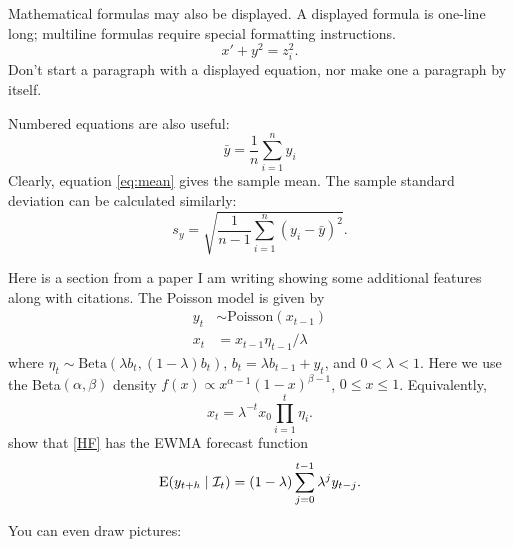 \documentclass[a4paper,11pt]{article}
\newcommand{\info}{{\cal I}}
\newcommand{\E}{\text{E}}
\begin{document}
Mathematical formulas may also be displayed.  A displayed formula
is one-line long; multiline formulas require special formatting
instructions.
\[
  x' + y^{2} = z_{i}^{2}.
\]
Don't start a paragraph with a displayed equation, nor make one a
paragraph by itself.

Numbered equations are also useful:
\begin{equation}\label{eq:mean} 
         \bar{y} = \frac{1}{n} \sum_{i=1}^{n} y_i
\end{equation}
Clearly, equation \eqref{eq:mean} gives the sample mean.  The
sample standard deviation can be calculated similarly:
\begin{equation}
        s_y = \sqrt{ \frac{1}{n-1} \sum_{i=1}^n (y_i-\bar{y})^2 }.
\end{equation}

Here is a section from a paper I am writing showing some additional features along with citations. The Poisson model \citep{SM86} is given by
\begin{subequations}\label{HF}
\begin{align}
y_t & \sim \text{Poisson}(x_{t-1}) \label{HF.1} \\
x_t & = x_{t-1} \eta_{t-1}/\lambda  \label{HF.2}
\end{align}
\end{subequations}
where $\eta_t \sim \text{Beta}(\lambda b_t,(1-\lambda) b_t)$, $b_t=\lambda b_{t-1}+y_t $, and $0<\lambda<1$.  Here we use the Beta$(\alpha,\beta)$ density $f(x) \propto x^{\alpha-1}(1-x)^{\beta-1}$, $0\le x\le1$. Equivalently,
\begin{equation}\label{prodeta}
x_t = \lambda^{-t}x_0\prod_{i=1}^t\eta_i.
\end{equation}
\citet{HF89} show that \eqref{HF} has the EWMA forecast function
\begin{equation*}
  \E(y_{t+h}\mid \info_t) = (1-\lambda)\sum_{j=0}^{t-1} \lambda^j y_{t-j}.
\end{equation*}


You can even draw pictures:
\begin{center}
\end{center}



\end{document}
